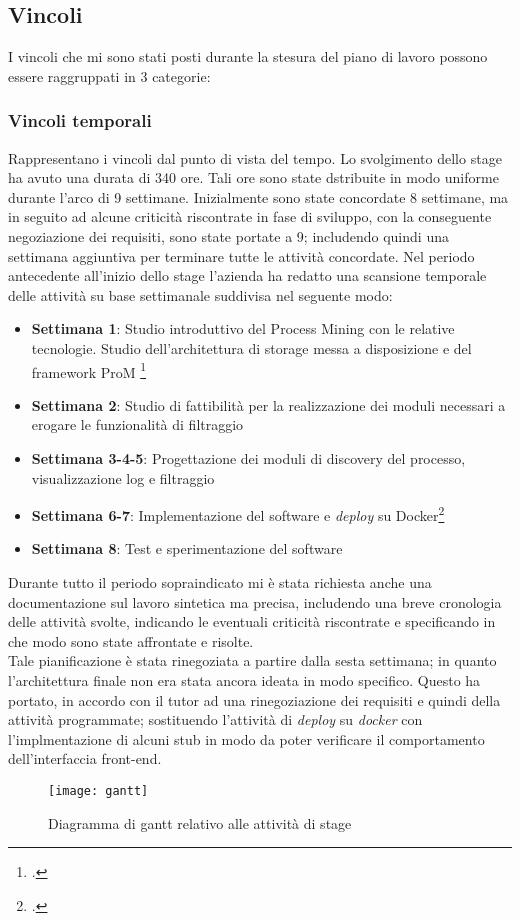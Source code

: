 \subsection{Vincoli}
I vincoli che mi sono stati posti durante la stesura del piano di lavoro possono essere raggruppati in 3 categorie:
\subsubsection{Vincoli temporali}
Rappresentano i vincoli dal punto di vista del tempo. Lo svolgimento dello stage ha avuto una durata di 340 ore. Tali ore sono state dstribuite in modo uniforme durante l'arco di 9 settimane. Inizialmente sono state concordate 8 settimane, ma in seguito ad alcune criticità riscontrate in fase di sviluppo, con la conseguente negoziazione dei requisiti, sono state portate a 9; includendo quindi una settimana aggiuntiva per terminare tutte le attività concordate.
Nel periodo antecedente all'inizio dello stage l'azienda ha redatto una scansione temporale delle attività su base settimanale suddivisa nel seguente modo:
\begin{itemize}
	\item \textbf{Settimana 1}: Studio introduttivo del Process Mining con le relative tecnologie. Studio dell’architettura di storage messa a disposizione e del	framework ProM \footcite{ProM: www.promtools.org}
	\item \textbf{Settimana 2}: Studio di fattibilità per la realizzazione dei moduli necessari a erogare le funzionalità di filtraggio
    \item \textbf{Settimana 3-4-5}: Progettazione dei moduli di discovery del processo, visualizzazione log e filtraggio
    \item \textbf{Settimana 6-7}: Implementazione del software e \textit{\gls{deploy}} su Docker\footcite{Docker: https://www.docker.com}
    \item \textbf{Settimana 8}: Test e sperimentazione del software
\end{itemize}
Durante tutto il periodo sopraindicato mi è stata richiesta anche una documentazione sul lavoro sintetica ma precisa, includendo una breve cronologia delle attività svolte, indicando le eventuali criticità riscontrate e specificando in che modo sono state affrontate e risolte.\\
Tale pianificazione è stata rinegoziata a partire dalla sesta settimana; in quanto l'architettura finale non era stata ancora ideata in modo specifico. Questo ha portato, in accordo con il tutor ad una rinegoziazione dei requisiti e quindi della attività programmate; sostituendo l'attività di \textit{deploy} su \textit{docker} con l'implmentazione di alcuni stub in modo da poter verificare il comportamento dell'interfaccia front-end.
\begin{figure}[!h] 
	\centering 
	\texttt{[image: gantt]} 
	\caption{Diagramma di gantt relativo alle attività di stage}
\end{figure}
